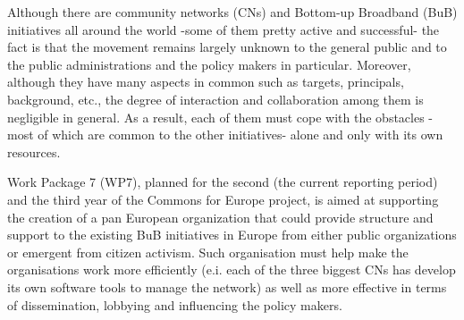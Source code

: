 Although there are community networks (CNs) and Bottom-up Broadband (BuB) initiatives all around the world -some of them pretty active and successful- the fact is that the movement remains largely unknown to the general public and to the public administrations and the policy makers in particular. Moreover, although they have many aspects in common such as targets, principals, background, etc., the degree of interaction and collaboration among them is negligible in general. As a result, each of them must cope with the obstacles -most of which are common to the other initiatives- alone and only with its own resources.

Work Package 7 (WP7), planned for the second (the current reporting period) and the third year of the Commons for Europe project, is aimed at supporting the creation of a pan European organization that could provide structure and support to the existing BuB initiatives in Europe from either public organizations or emergent from citizen activism. Such organisation must help make the organisations work more efficiently (e.i. each of the three biggest CNs has develop its own software tools to manage the network) as well as more effective in terms of dissemination, lobbying and influencing the policy makers.
